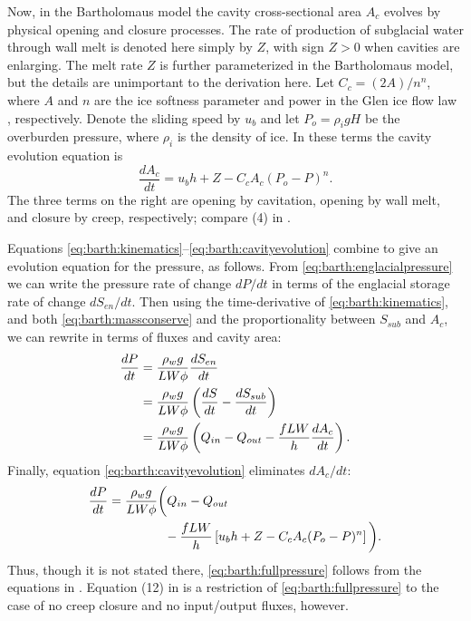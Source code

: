 \documentclass[twocolumn,letterpaper]{igs}
\begin{document}
Now, in the Bartholomaus model the cavity cross-sectional area $A_c$ evolves by physical opening and closure processes.  The rate of production of subglacial water through wall melt is denoted here simply by $Z$, with sign $Z>0$ when cavities are enlarging.  The melt rate $Z$ is further parameterized in the Bartholomaus model, but the details are unimportant to the derivation here.  Let $C_c = (2 A)/n^n$, where $A$ and $n$ are the ice softness parameter and power in the Glen ice flow law \citep{CuffeyPaterson}, respectively.  Denote the sliding speed by $u_b$ and let $P_o=\rho_i g H$ be the overburden pressure, where $\rho_i$ is the density of ice.  In these terms the cavity evolution equation is
\begin{equation}
\frac{dA_c}{dt} = u_b h + Z - C_c A_c (P_o-P)^n.  \label{eq:barth:cavityevolution}
\end{equation}
The three terms on the right are opening by cavitation, opening by wall melt, and closure by creep, respectively; compare (4) in \cite{Bartholomausetal2011}.

Equations \eqref{eq:barth:kinematics}--\eqref{eq:barth:cavityevolution} combine to give an evolution equation for the pressure, as follows.  From \eqref{eq:barth:englacialpressure} we can write the pressure rate of change $dP/dt$ in terms of the englacial storage rate of change $d S_{en}/dt$.  Then using the time-derivative of \eqref{eq:barth:kinematics}, and both \eqref{eq:barth:massconserve} and the proportionality between $S_{sub}$ and $A_c$, we can rewrite in terms of fluxes and cavity area:
\begin{align}
\frac{dP}{dt} &= \frac{\rho_w g}{L W \phi} \frac{d S_{en}}{dt} \\
&= \frac{\rho_w g}{L W \phi} \left(\frac{d S}{dt} - \frac{d S_{sub}}{dt}\right) \notag \\
&= \frac{\rho_w g}{L W \phi} \left(Q_{in} - Q_{out} - \frac{f L W}{h} \frac{d A_c}{dt}\right). \notag
\end{align}
Finally, equation \eqref{eq:barth:cavityevolution} eliminates $dA_c/dt$:
\begin{align}
&\frac{dP}{dt} = \frac{\rho_w g}{L W \phi} \bigg(Q_{in} - Q_{out} \label{eq:barth:fullpressure} \\
&\qquad \qquad \qquad - \frac{f L W}{h} \left[u_b h + Z - C_c A_c (P_o-P)^n\right]\bigg). \notag
\end{align}
Thus, though it is not stated there, \eqref{eq:barth:fullpressure} follows from the equations in \cite{Bartholomausetal2011}.  Equation (12) in \cite{Bartholomausetal2011} is a restriction of \eqref{eq:barth:fullpressure} to the case of no creep closure and no input/output fluxes, however.
\end{document}
